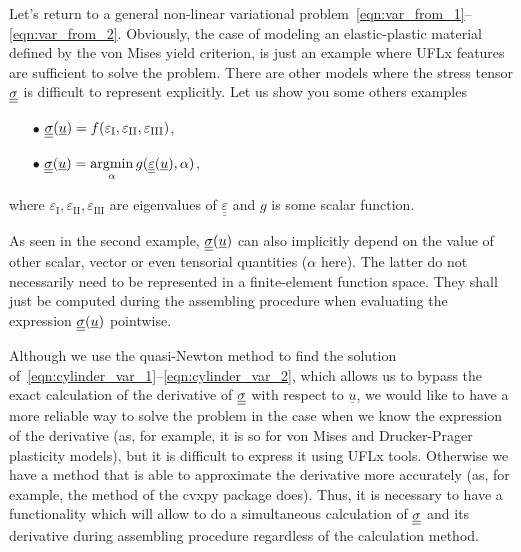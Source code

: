 \documentclass[12pt]{article}
\begin{document}
Let's return to a general non-linear variational problem~\ref{eqn:var_from_1}--\ref{eqn:var_from_2}. Obviously, the case of modeling an elastic-plastic material defined by the von Mises yield criterion, is just an example where UFLx features are sufficient to solve the problem. There are other models where the stress tensor $\underline{\underline{\sigma}}$ is difficult to represent explicitly. Let us show you some others examples

\begin{itemize}
    \item[$\bullet$] $\underline{\underline{\sigma}}(\underline{u}) = f(\varepsilon_\text{I}, \varepsilon_\text{II}, \varepsilon_\text{III})$,
    \item[$\bullet$] $\underline{\underline{\sigma}}(\underline{u}) = \underset{\alpha}{\operatorname{argmin}}\, g(\underline{\underline{\varepsilon}}(\underline{u}),  \alpha)$,
\end{itemize}
where $\varepsilon_\text{I}, \varepsilon_\text{II}, \varepsilon_\text{III}$ are eigenvalues of $\underline{\underline{\varepsilon}}$ and $g$ is some scalar function.




As seen in the second example, $\underline{\underline{\sigma}}(\underline{u})$ can also implicitly depend on the value of other scalar, vector or even tensorial quantities ($\alpha$ here). The latter do not necessarily need to be represented in a finite-element function space. They shall just be computed during the assembling procedure when evaluating the expression $\underline{\underline{\sigma}}(\underline{u})$ pointwise.

Although we use the quasi-Newton method to find the solution of~\ref{eqn:cylinder_var_1}--\ref{eqn:cylinder_var_2}, which allows us to bypass the exact calculation of the derivative of $\underline{\underline{\sigma}}$ with respect to $\underline{u}$, we would like to have a more reliable way to solve the problem in the case when we know the expression of the derivative (as, for example, it is so for von Mises and Drucker-Prager plasticity models), but it is difficult to express it using UFLx tools. Otherwise we have a method that is able to approximate the derivative more accurately (as, for example, the  method of the cvxpy package does). Thus, it is necessary to have a functionality which will allow to do a simultaneous calculation of $\underline{\underline{\sigma}}$ and its derivative during assembling procedure regardless of the calculation method.
\end{document}
